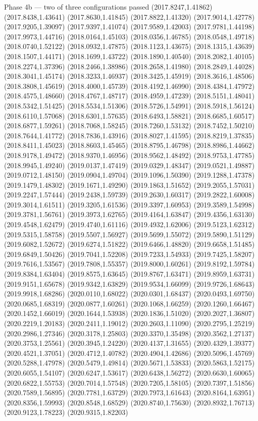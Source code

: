 \documentclass[aspectratio=169,10pt]{beamer}
\begin{document}
\begin{frame}[t]{Phase 4b — two of three configurations passed}
(2017.8247,1.41862) (2017.8438,1.43641) (2017.8630,1.41845) (2017.8822,1.41320) (2017.9014,1.42778) (2017.9205,1.39097) (2017.9397,1.41074) (2017.9589,1.42003) (2017.9781,1.44198) (2017.9973,1.44716) (2018.0164,1.45103) (2018.0356,1.46785) (2018.0548,1.49718) (2018.0740,1.52122) (2018.0932,1.47875) (2018.1123,1.43675) (2018.1315,1.43639) (2018.1507,1.44171) (2018.1699,1.43722) (2018.1890,1.40540) (2018.2082,1.40105) (2018.2274,1.37396) (2018.2466,1.38986) (2018.2658,1.41980) (2018.2849,1.44028) (2018.3041,1.45174) (2018.3233,1.46937) (2018.3425,1.45919) (2018.3616,1.48506) (2018.3808,1.45619) (2018.4000,1.45739) (2018.4192,1.46990) (2018.4384,1.47972) (2018.4575,1.48660) (2018.4767,1.48717) (2018.4959,1.47239) (2018.5151,1.48041) (2018.5342,1.51425) (2018.5534,1.51306) (2018.5726,1.54991) (2018.5918,1.56124) (2018.6110,1.57068) (2018.6301,1.57635) (2018.6493,1.58821) (2018.6685,1.60517) (2018.6877,1.59261) (2018.7068,1.58245) (2018.7260,1.53132) (2018.7452,1.50210) (2018.7644,1.41772) (2018.7836,1.43916) (2018.8027,1.41595) (2018.8219,1.37835) (2018.8411,1.45023) (2018.8603,1.45465) (2018.8795,1.46798) (2018.8986,1.44662) (2018.9178,1.49472) (2018.9370,1.46956) (2018.9562,1.48492) (2018.9753,1.47785) (2018.9945,1.49240) (2019.0137,1.47419) (2019.0329,1.48347) (2019.0521,1.49887) (2019.0712,1.48150) (2019.0904,1.49704) (2019.1096,1.50390) (2019.1288,1.47378) (2019.1479,1.48302) (2019.1671,1.49290) (2019.1863,1.51652) (2019.2055,1.57031) (2019.2247,1.57444) (2019.2438,1.59739) (2019.2630,1.60317) (2019.2822,1.60008) (2019.3014,1.61511) (2019.3205,1.61536) (2019.3397,1.60953) (2019.3589,1.54998) (2019.3781,1.56761) (2019.3973,1.62765) (2019.4164,1.63847) (2019.4356,1.63130) (2019.4548,1.62479) (2019.4740,1.61116) (2019.4932,1.62006) (2019.5123,1.62312) (2019.5315,1.58758) (2019.5507,1.56927) (2019.5699,1.55072) (2019.5890,1.51129) (2019.6082,1.52672) (2019.6274,1.51822) (2019.6466,1.48820) (2019.6658,1.51485) (2019.6849,1.50426) (2019.7041,1.52208) (2019.7233,1.54933) (2019.7425,1.58207) (2019.7616,1.53567) (2019.7808,1.55357) (2019.8000,1.60261) (2019.8192,1.59784) (2019.8384,1.63404) (2019.8575,1.63645) (2019.8767,1.63471) (2019.8959,1.63731) (2019.9151,1.65678) (2019.9342,1.63829) (2019.9534,1.66099) (2019.9726,1.68643) (2019.9918,1.68286) (2020.0110,1.68022) (2020.0301,1.68437) (2020.0493,1.69750) (2020.0685,1.68319) (2020.0877,1.60261) (2020.1068,1.66259) (2020.1260,1.66467) (2020.1452,1.66019) (2020.1644,1.53938) (2020.1836,1.51020) (2020.2027,1.36807) (2020.2219,1.20183) (2020.2411,1.19012) (2020.2603,1.11090) (2020.2795,1.25219) (2020.2986,1.27346) (2020.3178,1.25803) (2020.3370,1.35498) (2020.3562,1.27137) (2020.3753,1.25561) (2020.3945,1.24220) (2020.4137,1.31655) (2020.4329,1.39377) (2020.4521,1.37051) (2020.4712,1.40782) (2020.4904,1.42686) (2020.5096,1.45769) (2020.5288,1.47978) (2020.5479,1.49814) (2020.5671,1.53833) (2020.5863,1.52175) (2020.6055,1.54107) (2020.6247,1.53617) (2020.6438,1.56272) (2020.6630,1.60065) (2020.6822,1.55753) (2020.7014,1.57548) (2020.7205,1.58105) (2020.7397,1.51856) (2020.7589,1.56895) (2020.7781,1.63729) (2020.7973,1.61643) (2020.8164,1.63951) (2020.8356,1.59993) (2020.8548,1.68529) (2020.8740,1.75630) (2020.8932,1.76713) (2020.9123,1.78223) (2020.9315,1.82203) 
\end{frame}
\end{document}
